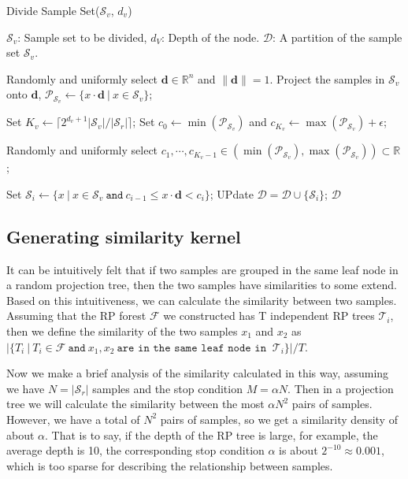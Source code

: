 \begin{algorithm}
\begin{algorithmic}

\caption{Divide Sample Set($\mathcal{S}_v$, $d_v$)}
\Require $\mathcal{S}_v$: Sample set to be divided, $d_V$: Depth of the node.
\Ensure $\mathcal{D}$: A partition of the sample set $\mathcal{S}_v$.

\State Randomly and uniformly select $\mathbf{d}\in\mathbb{R}^n$ and $\lVert\mathbf{d}\rVert=1$.
\State Project the samples in $\mathcal{S}_v$ onto $\mathbf{d}$, $\mathcal{P}_{\mathcal{S}_v}\gets\{x\cdot\mathbf{d}~|~x\in\mathcal{S}_v\}$;

\State Set $K_v\gets\lceil2^{d_v+1}|\mathcal{S}_v|/|\mathcal{S}_r|\rceil$;
\State Set $c_0\gets\min(\mathcal{P}_{\mathcal{S}_v})$ and $c_{K_v}\gets\max(\mathcal{P}_{\mathcal{S}_v})+\epsilon$;

\State Randomly and uniformly select $c_1,\cdots,c_{K_v-1}\in(\min(\mathcal{P}_{\mathcal{S}_v}), \max(\mathcal{P}_{\mathcal{S}_v}))\subset\mathbb{R}$;

\State Set $\mathcal{S}_i\gets\{x~|~x\in\mathcal{S}_v~\texttt{and}~c_{i-1}\leqslant x\cdot\mathbf{d}<c_i\}$;
\State UPdate $\mathcal{D}=\mathcal{D}\cup\{\mathcal{S}_i\}$;
\EndFor
\State\Return $\mathcal{D}$
\end{algorithmic}
\end{algorithm}


\subsection{Generating similarity kernel}
It can be intuitively felt that if two samples are grouped in the same leaf node in a random projection tree, then the two samples have similarities to some extend. 
Based on this intuitiveness, we can calculate the similarity between two samples. Assuming that the RP forest $\mathcal{F}$ we constructed has T independent RP trees $\mathcal{T}_i$, then we define the similarity of the two samples $x_1$ and $x_2$ as $|\{T_i~|~T_i\in\mathcal{F}~\texttt{and}~x_1,x_2~\texttt{are in the same leaf node in }~\mathcal{T}_i\}|/T$.

Now we make a brief analysis of the similarity calculated in this way, assuming we have $N=|\mathcal{S}_r|$ samples and the stop condition $M=\alpha N$. Then in a projection tree we will calculate the similarity between the most $\alpha N^2$ pairs of samples. However, we have a total of $N^2$ pairs of samples, so we get a similarity density of about $\alpha$. 
That is to say, if the depth of the RP tree is large, for example, the average depth is 10, the corresponding stop condition $\alpha$ is about $2^{-10}\approx 0.001$, which is too sparse for describing the relationship between samples.

